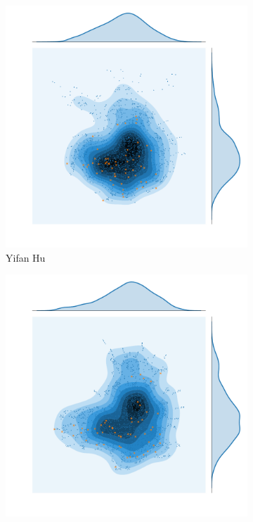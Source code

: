 \begin{figure}[H]
     \centering
    \begin{subfigure}[b]{.49\textwidth}
         \centering \includegraphics[width=\textwidth,angle=90]{figures_c1/layout/yfan_aphh.pdf}
         \caption{Yifan Hu}
         \label{fig:yfan}
     \end{subfigure}
     \begin{subfigure}[b]{.49\textwidth}
         \centering \includegraphics[width=\textwidth,angle=0]{figures_c1/layout/fa_aphh.pdf}

\end{subfigure}
\end{figure}
